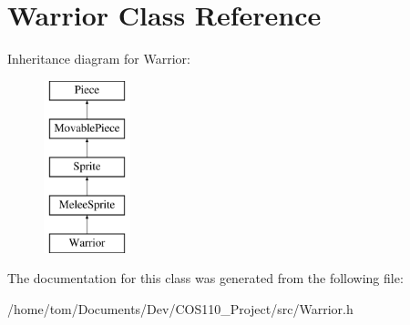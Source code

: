 \hypertarget{classWarrior}{\section{Warrior Class Reference}
\label{classWarrior}
}
Inheritance diagram for Warrior\-:\begin{figure}[H]
\begin{center}
\leavevmode
\includegraphics[height=5.000000cm]{classWarrior}
\end{center}
\end{figure}


The documentation for this class was generated from the following file\-:\begin{DoxyCompactItemize}
\item 
/home/tom/\-Documents/\-Dev/\-C\-O\-S110\-\_\-\-Project/src/Warrior.\-h\end{DoxyCompactItemize}
